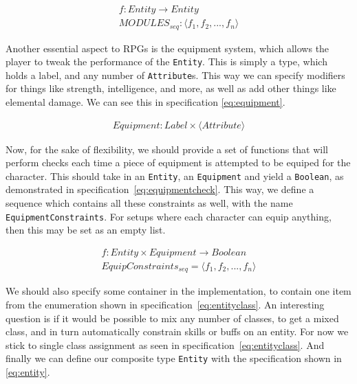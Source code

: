 \begin{equation}
\begin{split}
  \label{eq:funcmodules}
  f \colon Entity \to Entity \\
  MODULES_{seq}\colon \langle f_1, f_2, ..., f_n \rangle
\end{split}
\end{equation}

Another essential aspect to RPGs is the equipment system, which allows the
player to tweak the performance of the \texttt{Entity}. This is simply a type,
which holds a label, and any number of \texttt{Attribute}s. This way we can
specify modifiers for things like strength, intelligence, and more, as well as
add other things like elemental damage. We can see this in specification
\ref{eq:equipment}.

\begin{equation}
\begin{split}
  \label{eq:equipment}
  Equipment\colon Label \times \langle Attribute \rangle
\end{split}
\end{equation}

Now, for the sake of flexibility, we should provide a set of functions that will
perform checks each time a piece of equipment is attempted to be equiped for the
character. This should take in an \texttt{Entity}, an \texttt{Equipment} and
yield a \texttt{Boolean}, as demonstrated in
specification~\ref{eq:equipmentcheck}. This way, we define a sequence which
contains all these constraints as well, with the name
\texttt{EquipmentConstraints}. For setups where each character can equip
anything, then this may be set as an empty list.

\begin{equation}
\begin{split}
  \label{eq:equipmentcheck}
  f\colon Entity \times Equipment \to Boolean \\
  EquipConstraints_{seq} = \langle f_1, f_2, ..., f_n \rangle
\end{split}
\end{equation}

We should also specify some container in the implementation, to contain one item
from the enumeration shown in specification~\ref{eq:entityclass}. An interesting
question is if it would be possible to mix any number of classes, to get a mixed
class, and in turn automatically constrain skills or buffs on an entity. For now
we stick to single class assignment as seen in
specification~\ref{eq:entityclass}. And finally we can define our composite type
\texttt{Entity} with the specification shown in \ref{eq:entity}.

